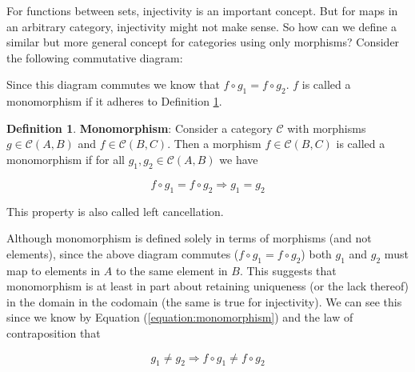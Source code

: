 \documentclass{article}
\theoremstyle{definition}
\newtheorem{definition}{Definition}[section]
\begin{document}
\bigskip
\noindent
For functions between sets, injectivity is an important
concept. But for maps in an arbitrary category, injectivity might
not make sense. So how can we define a similar but more general
concept for categories using only morphisms? Consider the
following commutative diagram:

\smallskip
%
%
\begin{center}
\end{center}

\smallskip
\noindent
Since this diagram commutes we know that $f \circ g_{1} = f \circ
g_{2}$.  $f$ is called a monomorphism if it adheres to Definition
\ref{definition:monomorphism}.

\bigskip
\begin{definition} {\bf Monomorphism}: Consider a category
$\mathcal{C}$ with morphisms $g \in \mathcal{C}(A,B)$ and $f \in
\mathcal{C}(B,C)$. Then a morphism $f \in \mathcal{C}(B,C)$ is
called a monomorphism if for all $g_{1},g_{2} \in
\mathcal{C}(A,B)$ we have


\begin{equation}
f \circ g_{1} = f \circ g_{2} \Rightarrow g_{1} = g_{2} 
\label{equation:monomorphism}
\end{equation}

\medskip
\noindent
This property is also called left cancellation.
\label{definition:monomorphism}
\end{definition}


\medskip
\noindent
Although monomorphism is defined solely in terms of morphisms
(and not elements), since the above diagram commutes ($f \circ
g_{1} = f \circ g_{2}$) both $g_{1}$ and $g_{2}$ must map to
elements in $A$ to the same element in $B$. This suggests that
monomorphism is at least in part about retaining uniqueness (or
the lack thereof) in the domain in the codomain (the same is true
for injectivity).  We can see this since we know by Equation
(\ref{equation:monomorphism}) and the law of contraposition
\cite{wikipedia:contraposition} that
  
\begin{equation}
g_{1} \neq g_{2} \Rightarrow f \circ g_{1} \neq f \circ g_{2} 
\label{equation:contraposition}
\end{equation}
\end{document}
